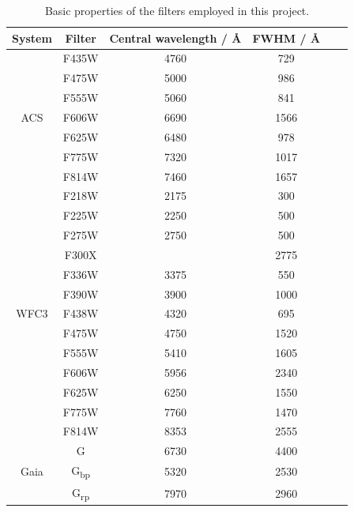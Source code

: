 \documentclass[12pt, a4paper]{report}
\begin{document}
\begin{table}
\begin{center}
\begin{tabular}{cccccc}
\hline
System & Filter & Central wavelength / \AA & FWHM / \AA \\
\hline
& F435W & 4760 & 729 \\
& F475W & 5000 & 986 \\
& F555W & 5060 & 841 \\
ACS & F606W & 6690 & 1566 \\
& F625W & 6480 & 978 \\
& F775W & 7320 & 1017 \\
& F814W & 7460 & 1657 \\
\hline
& F218W & 2175 & 300 \\
& F225W & 2250 & 500 \\
& F275W & 2750 & 500 \\
& F300X &  & 2775 \\
& F336W & 3375 & 550 \\
& F390W & 3900 & 1000 \\
WFC3 & F438W & 4320 & 695 \\
& F475W & 4750 & 1520 \\
& F555W & 5410 & 1605 \\
& F606W & 5956 & 2340 \\
& F625W & 6250 & 1550 \\
& F775W & 7760 & 1470 \\
& F814W & 8353 & 2555 \\
\hline
& G & 6730 & 4400 \\
Gaia & G\textsubscript{bp} & 5320 & 2530 \\
& G\textsubscript{rp} & 7970 & 2960 \\
\hline

\end{tabular}
\caption{Basic properties of the filters employed in this project.}
\label{filter_basics}
\end{center}
\end{table}
\end{document}
